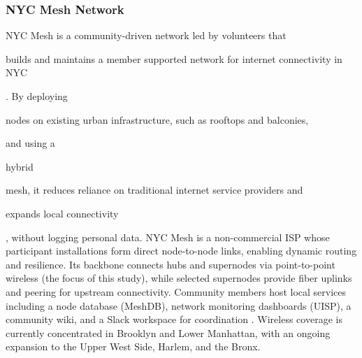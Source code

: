\documentclass[manuscript]{copernicus}
\newif\ifshowrevisions
\newcommand{\blue}[1]{%
  \ifshowrevisions
    \textcolor{black}{#1}%
  \else
    #1%
  \fi
}
\begin{document}






\subsubsection{NYC Mesh Network}\label{sec:nyc_mesh}
NYC Mesh \citep{NYCMeshMainSite} is a community-driven network led by volunteers that \blue{builds and maintains a member supported network for internet connectivity in NYC}. 
By deploying \blue{nodes on existing urban infrastructure, such as rooftops and balconies,} and using a \blue{hybrid} mesh, it reduces reliance on traditional internet service providers and \blue{expands local connectivity}, without logging personal data.
NYC Mesh is a non-commercial ISP whose participant installations form direct node-to-node links, enabling dynamic routing and resilience. Its backbone connects hubs and supernodes via point-to-point wireless (the focus of this study), while selected supernodes provide fiber uplinks and peering for upstream connectivity. Community members host local services including a node database (MeshDB), network monitoring dashboards (UISP), a community wiki, and a Slack workspace for coordination \citep{NYCMeshWiki2025,NYCMeshGitHub2025,NYCMeshMainSite}.
Wireless coverage is currently concentrated in Brooklyn and Lower Manhattan, with an ongoing expansion to the Upper West Side, Harlem, and the Bronx.
\end{document}
